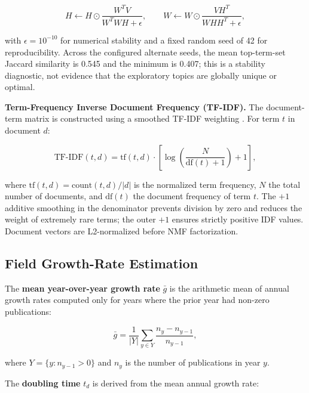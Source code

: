 \documentclass[
  english,
]{article}
\begin{document}
\begin{equation}
H \leftarrow H \odot \frac{W^T V}{W^T W H + \epsilon}, \qquad W \leftarrow W \odot \frac{V H^T}{W H H^T + \epsilon}, \label{eq:nmf_update}
\end{equation}

with \(\epsilon = 10^{-\!10}\) for numerical stability and a fixed
random seed of 42 for reproducibility. Across the configured alternate
seeds, the mean top-term-set Jaccard similarity is 0.545 and the minimum
is 0.407; this is a stability diagnostic, not evidence that the
exploratory topics are globally unique or optimal.

\textbf{Term-Frequency Inverse Document Frequency (TF-IDF).} The
document-term matrix is constructed using a smoothed TF-IDF weighting
\citep{salton1975vector}. For term \(t\) in document \(d\):

\begin{equation}
\text{TF-IDF}(t, d) = \text{tf}(t, d) \cdot \left[\log\!\left(\frac{N}{\text{df}(t) + 1}\right) + 1\right], \label{eq:tfidf}
\end{equation}

where \(\text{tf}(t, d) = \text{count}(t,d) / |d|\) is the normalized
term frequency, \(N\) the total number of documents, and
\(\text{df}(t)\) the document frequency of term \(t\). The \(+1\)
additive smoothing in the denominator prevents division by zero and
reduces the weight of extremely rare terms; the outer \(+1\) ensures
strictly positive IDF values. Document vectors are L2-normalized before
NMF factorization.

\FloatBarrier

\subsection{Field Growth-Rate Estimation}\label{sec:appendix_growth}

The \textbf{mean year-over-year growth rate} \(\bar{g}\) is the
arithmetic mean of annual growth rates computed only for years where the
prior year had non-zero publications:

\begin{equation}
\bar{g} = \frac{1}{|Y|} \sum_{y \in Y} \frac{n_y - n_{y-1}}{n_{y-1}}, \label{eq:mean_growth}
\end{equation}

where \(Y = \{y : n_{y-1} > 0\}\) and \(n_y\) is the number of
publications in year \(y\).

The \textbf{doubling time} \(t_d\) is derived from the mean annual
growth rate:
\end{document}
